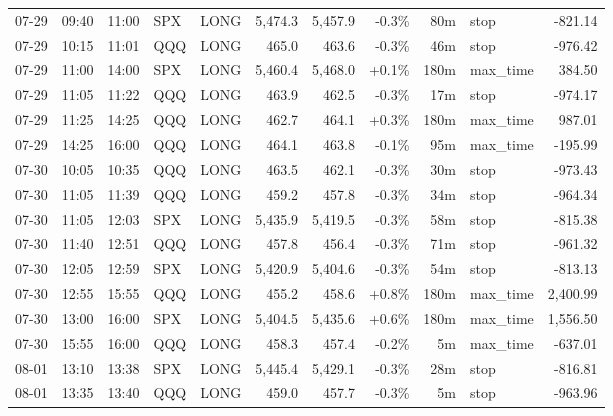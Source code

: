 \documentclass[11pt,a4paper,twoside]{article}
\begin{document}
\begin{center}
\begin{longtable}{>{\color{txtmain}}l l l l l r r r r >{\color{txtmain}}l r}
07-29 & 09:40 & 11:00 & SPX & LONG & 5,474.3 & 5,457.9 & \textcolor{lossred}{-0.3\%} & 80m & stop & \textcolor{lossred}{-821.14} \\
07-29 & 10:15 & 11:01 & QQQ & LONG & 465.0 & 463.6 & \textcolor{lossred}{-0.3\%} & 46m & stop & \textcolor{lossred}{-976.42} \\
07-29 & 11:00 & 14:00 & SPX & LONG & 5,460.4 & 5,468.0 & \textcolor{wingreen}{+0.1\%} & 180m & max\_time & \textcolor{wingreen}{384.50} \\
07-29 & 11:05 & 11:22 & QQQ & LONG & 463.9 & 462.5 & \textcolor{lossred}{-0.3\%} & 17m & stop & \textcolor{lossred}{-974.17} \\
07-29 & 11:25 & 14:25 & QQQ & LONG & 462.7 & 464.1 & \textcolor{wingreen}{+0.3\%} & 180m & max\_time & \textcolor{wingreen}{987.01} \\
07-29 & 14:25 & 16:00 & QQQ & LONG & 464.1 & 463.8 & \textcolor{lossred}{-0.1\%} & 95m & max\_time & \textcolor{lossred}{-195.99} \\
07-30 & 10:05 & 10:35 & QQQ & LONG & 463.5 & 462.1 & \textcolor{lossred}{-0.3\%} & 30m & stop & \textcolor{lossred}{-973.43} \\
07-30 & 11:05 & 11:39 & QQQ & LONG & 459.2 & 457.8 & \textcolor{lossred}{-0.3\%} & 34m & stop & \textcolor{lossred}{-964.34} \\
07-30 & 11:05 & 12:03 & SPX & LONG & 5,435.9 & 5,419.5 & \textcolor{lossred}{-0.3\%} & 58m & stop & \textcolor{lossred}{-815.38} \\
07-30 & 11:40 & 12:51 & QQQ & LONG & 457.8 & 456.4 & \textcolor{lossred}{-0.3\%} & 71m & stop & \textcolor{lossred}{-961.32} \\
07-30 & 12:05 & 12:59 & SPX & LONG & 5,420.9 & 5,404.6 & \textcolor{lossred}{-0.3\%} & 54m & stop & \textcolor{lossred}{-813.13} \\
07-30 & 12:55 & 15:55 & QQQ & LONG & 455.2 & 458.6 & \textcolor{wingreen}{+0.8\%} & 180m & max\_time & \textcolor{wingreen}{2,400.99} \\
07-30 & 13:00 & 16:00 & SPX & LONG & 5,404.5 & 5,435.6 & \textcolor{wingreen}{+0.6\%} & 180m & max\_time & \textcolor{wingreen}{1,556.50} \\
07-30 & 15:55 & 16:00 & QQQ & LONG & 458.3 & 457.4 & \textcolor{lossred}{-0.2\%} & 5m & max\_time & \textcolor{lossred}{-637.01} \\
08-01 & 13:10 & 13:38 & SPX & LONG & 5,445.4 & 5,429.1 & \textcolor{lossred}{-0.3\%} & 28m & stop & \textcolor{lossred}{-816.81} \\
08-01 & 13:35 & 13:40 & QQQ & LONG & 459.0 & 457.7 & \textcolor{lossred}{-0.3\%} & 5m & stop & \textcolor{lossred}{-963.96} \\

\end{longtable}
\end{center}
\end{document}
